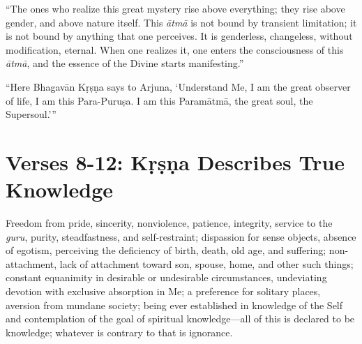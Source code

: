 \enquote{The ones who realize this great mystery rise above everything; they rise above gender, and above nature itself. This \textit{ātmā} is not bound by transient limitation; it is not bound by anything that one perceives. It is genderless, changeless, without modification, eternal. When one realizes it, one enters the consciousness of this \textit{ātmā}, and the essence of the Divine starts manifesting.}

\enquote{Here Bhagavān Kṛṣṇa says to Arjuna, \enquote{Understand Me, I am the great observer of life, I am this Para-Puruṣa. I am this Paramātmā, the great soul, the Supersoul.}}

\section{Verses 8-12: Kṛṣṇa Describes True Knowledge}\label{sec-verses-8-12-krishna-describes-true-knowledge}

{Freedom from pride, sincerity, nonviolence, patience, integrity, service to the \textit{guru}, purity, steadfastness, and self-restraint; dispassion for sense objects, absence of egotism, perceiving the deficiency of birth, death, old age, and suffering; non-attachment, lack of attachment toward son, spouse, home, and other such things; constant equanimity in desirable or undesirable circumstances, undeviating devotion with exclusive absorption in Me; a preference for solitary places, aversion from mundane society; being ever established in knowledge of the Self and contemplation of the goal of spiritual knowledge---all of this is declared to be knowledge; whatever is contrary to that is ignorance.}

